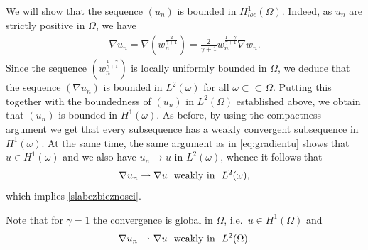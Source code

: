 \documentclass[12pt,a4paper]{amsart}
\theoremstyle{definition}
\begin{document}
We will show that the sequence $(u_n)$ is bounded in $H^1_{loc}(\Omega)$. Indeed, as $u_n$ are strictly positive in $\Omega$, we have
\begin{align}\label{eq:gradientu}
\nabla u_n =\nabla (w_n^{\frac{2}{\gamma +1}}) = \frac{2}{\gamma +1} w_n^{\frac{1-\gamma}{\gamma +1}}\nabla w_n.
\end{align}
Since the sequence $(w_n^{\frac{1-\gamma}{\gamma +1}})$ is locally uniformly bounded in $\Omega$, we deduce that
the sequence $(\nabla u_n)$ is bounded in $L^2(\omega)$ for all $\omega \subset\subset \Omega$. Putting this together with the boundedness of $(u_n)$ in $L^2(\Omega)$ established above, we obtain that $(u_n)$ is bounded in $H^1(\omega)$. As before, by using the compactness argument
we get that every subsequence has a weakly convergent subsequence in $H^1(\omega)$. At the same time, the same argument as in \eqref{eq:gradientu} shows that $u \in H^1(\omega)$ and we also have $u_n\rightarrow u$ in $L^2(\omega)$, whence it follows that 
\begin{equation}\label{slabazbloc}
\nabla u_n\rightharpoonup \nabla u\ \ \hbox{weakly in}\ \  L^2(\omega),
\end{equation}
which implies \eqref{slabezbieznosci}. 

Note that for $\gamma=1$ the convergence is global in $\Omega$, i.e.~$u \in H^1(\Omega)$ and 
\begin{equation*}
\nabla u_n\rightharpoonup \nabla u\ \ \hbox{weakly in}\ \  L^2(\Omega).
\end{equation*}
\end{document}
